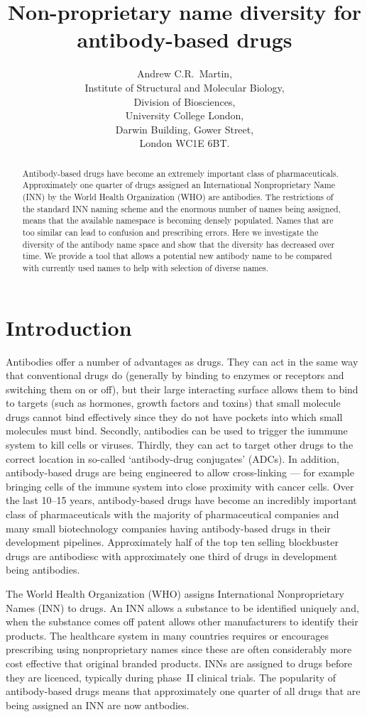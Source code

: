 \documentclass{article}
\title{Non-proprietary name diversity for antibody-based drugs}
\author{Andrew C.R.\ Martin,\\Institute of Structural and Molecular
  Biology,\\Division of Biosciences,\\University College
  London,\\Darwin Building, Gower Street,\\London WC1E 6BT.}
\begin{document}
\maketitle

\begin{abstract}
Antibody-based drugs have become an extremely important class of
pharmaceuticals. Approximately one quarter of drugs assigned an
International Nonproprietary Name (INN) by the World Health
Organization (WHO) are antibodies.  The restrictions of the standard
INN naming scheme and the enormous number of names being assigned,
means that the available namespace is becoming densely populated.
Names that are too similar can lead to confusion and prescribing
errors. Here we investigate the diversity of the antibody name space
and show that the diversity has decreased over time. We provide a tool
that allows a potential new antibody name to be compared with
currently used names to help with selection of diverse names.
\end{abstract}

\section{Introduction}
Antibodies offer a number of advantages as drugs. They can act in the
same way that conventional drugs do (generally by binding to enzymes
or receptors and switching them on or off), but their large
interacting surface allows them to bind to targets (such as hormones,
growth factors and toxins) that small molecule drugs cannot bind
effectively since they do not have pockets into which small molecules
must bind. Secondly, antibodies can be used to trigger the iummune
system to kill cells or viruses. Thirdly, they can act to target other
drugs to the correct location in so-called `antibody-drug conjugates'
(ADCs). In addition, antibody-based drugs are being engineered to
allow cross-linking --- for example bringing cells of the immune
system into close proximity with cancer cells. Over the last 10--15
years, antibody-based drugs have become an incredibly important class
of pharmaceuticals with the majority of pharmaceutical companies and
many small biotechnology companies having antibody-based drugs in
their development pipelines\cite{xxx}. Approximately half of the top
ten selling blockbuster drugs are antibodiesc\cite{xxx} with
approximately one third of drugs in development being
antibodies\cite{xxx}.

The World Health Organization (WHO) assigns International
Nonproprietary Names (INN) to drugs. An INN allows a substance to be
identified uniquely and, when the substance comes off patent allows
other manufacturers to identify their products. The healthcare system
in many countries requires or encourages prescribing using
nonproprietary names since these are often considerably more cost
effective that original branded products. INNs are assigned to drugs
before they are licenced, typically during phase~II clinical
trials. The popularity of antibody-based drugs means that
approximately one quarter of all drugs that are being assigned an INN
are now antbodies.
\end{document}
